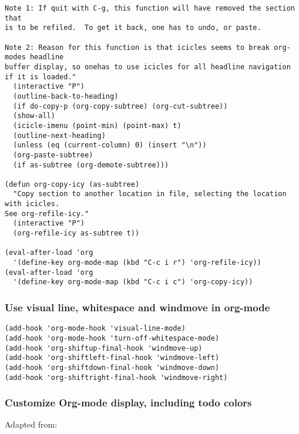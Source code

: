 \documentclass{article}
\begin{document}
\begin{enumerate}
\begin{verbatim}
Note 1: If quit with C-g, this function will have removed the section that
is to be refiled.  To get it back, one has to undo, or paste.

Note 2: Reason for this function is that icicles seems to break org-modes headline
buffer display, so onehas to use icicles for all headline navigation if it is loaded."
  (interactive "P")
  (outline-back-to-heading)
  (if do-copy-p (org-copy-subtree) (org-cut-subtree))
  (show-all)
  (icicle-imenu (point-min) (point-max) t)
  (outline-next-heading)
  (unless (eq (current-column) 0) (insert "\n"))
  (org-paste-subtree)
  (if as-subtree (org-demote-subtree)))

(defun org-copy-icy (as-subtree)
  "Copy section to another location in file, selecting the location with icicles.
See org-refile-icy."
  (interactive "P")
  (org-refile-icy as-subtree t))

(eval-after-load 'org
  '(define-key org-mode-map (kbd "C-c i r") 'org-refile-icy))
(eval-after-load 'org
  '(define-key org-mode-map (kbd "C-c i c") 'org-copy-icy))
\end{verbatim}
\end{enumerate}

\subsubsection{Use visual line, whitespace and windmove in org-mode}
\label{sec-2-5-4}

\begin{verbatim}
(add-hook 'org-mode-hook 'visual-line-mode)
(add-hook 'org-mode-hook 'turn-off-whitespace-mode)
(add-hook 'org-shiftup-final-hook 'windmove-up)
(add-hook 'org-shiftleft-final-hook 'windmove-left)
(add-hook 'org-shiftdown-final-hook 'windmove-down)
(add-hook 'org-shiftright-final-hook 'windmove-right)
\end{verbatim}

\subsubsection{Customize Org-mode display, including todo colors}
\label{sec-2-5-5}

Adapted from:
\end{document}
